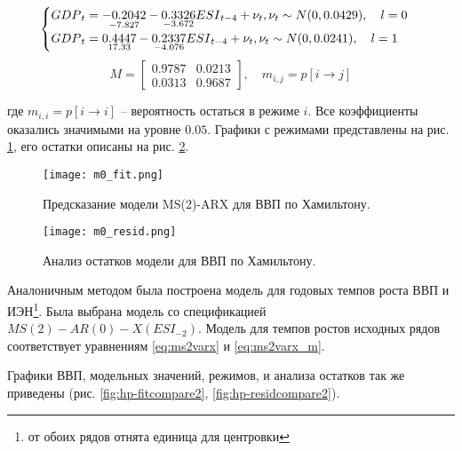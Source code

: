 \documentclass[../report.tex]{subfiles}
\begin{document}
	{

		\begin{equation}
			\label{eq:msvarx}
			\begin{cases}
				{GDP}_{t} = 
					\underset{-7.827}{-0.2042} 
					- \underset{-3.672}{0.3326} {ESI}_{t-4}
					+ \nu_{t} , \space \nu_{t} \sim N(0, 0.0429)
					, \quad l=0 \\
				{GDP}_{t} = 
					\underset{17.33}{0.4447}
					- \underset{-4.076}{0.2337} {ESI}_{t-4}
					+ \nu_{t} , \space \nu_{t} \sim N(0, 0.0241)
					, \quad l=1
			\end{cases}			
		\end{equation}
		\begin{equation}
			\label{eq:msvarx_m}
			M = 
				\begin{bmatrix}
				0.9787 & 0.0213 \\
				0.0313 & 0.9687
				\end{bmatrix}
			, \quad m_{i,j} = p[i \rightarrow j]
		\end{equation}
	
	}
	
	где $m_{i,i} = p[i \rightarrow i]$ – вероятность остаться в режиме $i$. Все коэффициенты оказались значимыми на уровне $0.05$. Графики с режимами представлены на рис. \ref{fig:hp-fitcompare}, его остатки описаны на рис. \ref{fig:hp-residcomp}.
	
	{
		\begin{figure}
			\texttt{[image: m0\_fit.png]}
			\caption{Предсказание модели MS(2)-ARX для ВВП по Хамильтону.}
			\label{fig:hp-fitcompare}
		\end{figure}
		\begin{figure}
			\texttt{[image: m0\_resid.png]}
			\caption{Анализ остатков модели для ВВП по Хамильтону.}
			\label{fig:hp-residcomp}
		\end{figure}
	}
	
	
	Аналоничным методом была построена модель для годовых темпов роста ВВП и ИЭН\footnote{от обоих рядов отнята единица для центровки}. Была выбрана модель со спецификацией $MS(2)-AR(0)-X({ESI}_{-2})$. Модель для темпов ростов исходных рядов соответствует уравнениям \ref{eq:ms2varx} и \ref{eq:ms2varx_m}.
	
	Графики ВВП, модельных значений, режимов, и анализа остатков так же приведены (рис. \ref{fig:hp-fitcompare2}, \ref{fig:hp-residcompare2}).
	
\end{document}
